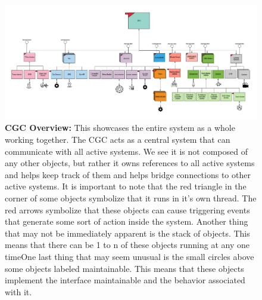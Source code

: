 \documentclass[12pt]{article}
\begin{document}
\begin{figure}[H]
    \centerline{\includegraphics[scale=.095]{CGCOverview.png}}
    \caption{\textbf{CGC Overview:} This showcases the entire system as a whole working together. The CGC 
acts as a central system that can communicate with all active systems. We see it is not composed 
of any other objects, but rather it owns references to all active systems and helps keep track of 
them and helps bridge connections to other active systems. It is important to note that the red 
triangle in the corner of some objects symbolize that it runs in it's own thread. The red arrows 
symbolize that these objects can cause triggering events that generate some sort of action inside the 
system. Another thing that may not be immediately apparent is the stack of objects. This means that there 
can be 1 to n of these objects running at any one timeOne last thing that may seem unusual is the 
small circles above some objects labeled maintainable. This means that these objects implement 
the interface maintainable and the behavior 
associated with it.}
  \label{fig:CGCOverview}
\end{figure}    
\end{document}
